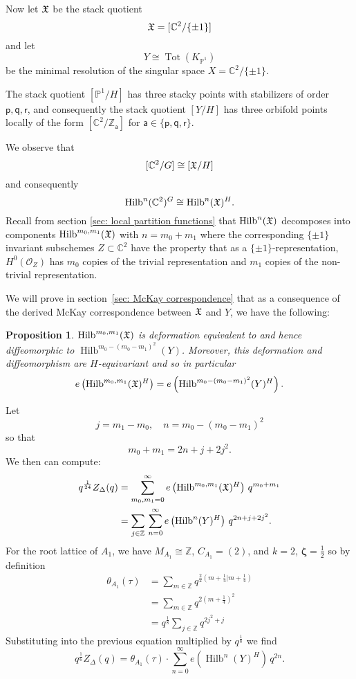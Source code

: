 \documentclass{article}
\newtheorem{proposition}[theorem]{Proposition}
\theoremstyle{definition}
\newcommand{\CC} {{\mathbb C}}          %
\newcommand{\ZZ} {{\mathbb Z}}		%
\newcommand{\PP}{\mathbb{P}}
\newcommand{\X}{\frak{X}}
\renewcommand{\O}{\mathcal{O}}
\newcommand{\varp}{\mathsf{p}}
\newcommand{\varq}{\mathsf{q}}
\newcommand{\varr}{\mathsf{r}}
\newcommand{\vara}{\mathsf{a}}
\newcommand{\zetavec}{\bm{\zeta }}
\newcommand{\Hilb}{\operatorname{Hilb}}
\begin{document}
\bigskip

Now let $\X$ be the stack quotient
\[
\X=[\CC^{2}/ \{\pm 1 \}]
\]
and let
\[
Y\cong \operatorname{Tot}(K_{\PP^{1}})
\]
be the minimal resolution of the singular space $X=\CC^{2}/\{\pm 1
\}$.

The stack quotient $[\PP^{1}/H]$ has three stacky points with
stabilizers of order $\varp ,\varq ,\varr$, and consequently the stack
quotient $[Y/H]$ has three orbifold points locally of the form
$[\CC^{2}/\ZZ_{\vara }]$ for $\vara \in \{\varp ,\varq ,\varr \}$.


We observe that 
\[
 [\CC^{2}/G ] \cong [\X /H ]
\]
and consequently
\[
\Hilb^{n}(\CC^{2})^{G}  \cong \Hilb^{n}(\X )^{H} .
\]
Recall from section \ref{sec: local partition functions} that $
\Hilb^{n}(\X )$ decomposes into components $\Hilb^{m_{0},m_{1}}(\X )$
with $n=m_{0}+m_{1}$ where the corresponding $\{\pm 1 \}$ invariant
subschemes $Z\subset \CC^{2}$ have the property that as a $\{\pm 1
\}$-representation, $H^{0}(\O_{Z})$ has $m_{0}$ copies of the trivial
representation and $m_{1}$ copies of the non-trivial representation.

We will prove in section~\ref{sec: McKay correspondence} that as a
consequence of the derived McKay correspondence between $\X$ and $Y$,
we have the following:
\begin{proposition}\label{prop: Hilb(X,m0,m1) = Hilb(Y,m0-(m0-m1)^2)}
$\Hilb^{m_{0},m_{1}}(\X )$ is deformation equivalent to and hence
diffeomorphic to $\Hilb^{m_{0}-(m_{0}-m_{1})^{2}}(Y)$. Moreover, this
deformation and diffeomorphism are $H$-equivariant and so in
particular
\[
e\left(\Hilb^{m_{0},m_{1}}(\X )^{H} \right)
=e\left(\Hilb^{m_{0}-(m_{0}-m_{1})^{2}}(Y)^{H} \right). 
\]
\end{proposition}

Let
\[
j=m_{1}-m_{0}, \quad n=m_{0}-(m_{0}-m_{1})^{2} 
\]
so that
\[
m_{0}+m_{1} = 2n +j + 2j^{2}. 
\]
We then can compute:
\begin{align*}
q^{\frac{1}{24}} Z_{\Delta}(q) &= \sum_{m_{0},m_{1}= 0}^{\infty } 
e\left(\Hilb^{m_{0},m_{1}}(\X )^{H} \right) \, q^{m_{0}+m_{1}} \\
&= \sum_{j\in \ZZ}\,  \sum_{n=0}^{\infty} e\left(\Hilb^{n}(Y)^{H}
\right)\, q^{2n+j+2j^{2}}.
\end{align*}
For the root lattice of $A_{1}$, we have $M_{A_{1}}\cong \ZZ$,  $C_{A_{1}}=(2)$, and $k=2$,
$\zetavec =\frac{1}{2}$ so by definition
\begin{align*}
\theta_{A_{1}}(\tau ) &= \sum_{m\in \ZZ}
q^{\frac{2}{2}\left(m+\frac{1}{4}|m+\frac{1}{4} \right)} \\
&=\sum_{m\in \ZZ} q^{2(m+\frac{1}{4})^{2}} \\
&=q^{\frac{1}{8}} \sum_{j\in \ZZ} q^{2j^{2}+j}
\end{align*}
Substituting into the previous equation multiplied by
$q^{\frac{1}{8}}$ we find
\[
q^{\frac{1}{6}} Z_{\Delta}(q) = \theta_{A_{1}}(\tau ) \cdot
\sum_{n=0}^{\infty}  e\left(\Hilb^{n}(Y)^{H}
\right)\, q^{2n}.
\]
\end{document}
